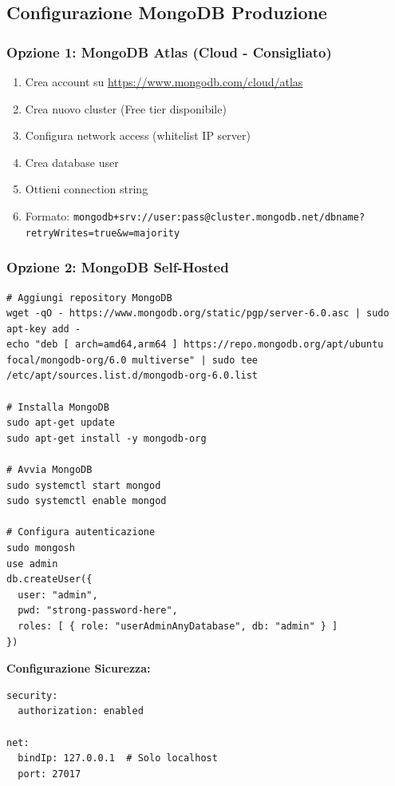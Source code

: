 \documentclass[11pt,a4paper]{article}
\newcommand{\code}[1]{\texttt{#1}}
\begin{document}
\subsection{Configurazione MongoDB Produzione}

\subsubsection{Opzione 1: MongoDB Atlas (Cloud - Consigliato)}

\begin{enumerate}
    \item Crea account su \url{https://www.mongodb.com/cloud/atlas}
    \item Crea nuovo cluster (Free tier disponibile)
    \item Configura network access (whitelist IP server)
    \item Crea database user
    \item Ottieni connection string
    \item Formato: \code{mongodb+srv://user:pass@cluster.mongodb.net/dbname?retryWrites=true\&w=majority}
\end{enumerate}

\subsubsection{Opzione 2: MongoDB Self-Hosted}

\begin{lstlisting}[caption=Installazione MongoDB su Server]
# Aggiungi repository MongoDB
wget -qO - https://www.mongodb.org/static/pgp/server-6.0.asc | sudo apt-key add -
echo "deb [ arch=amd64,arm64 ] https://repo.mongodb.org/apt/ubuntu focal/mongodb-org/6.0 multiverse" | sudo tee /etc/apt/sources.list.d/mongodb-org-6.0.list

# Installa MongoDB
sudo apt-get update
sudo apt-get install -y mongodb-org

# Avvia MongoDB
sudo systemctl start mongod
sudo systemctl enable mongod

# Configura autenticazione
sudo mongosh
use admin
db.createUser({
  user: "admin",
  pwd: "strong-password-here",
  roles: [ { role: "userAdminAnyDatabase", db: "admin" } ]
})
\end{lstlisting}

\textbf{Configurazione Sicurezza:}
\begin{lstlisting}[caption=/etc/mongod.conf]
security:
  authorization: enabled

net:
  bindIp: 127.0.0.1  # Solo localhost
  port: 27017
\end{lstlisting}
\end{document}
